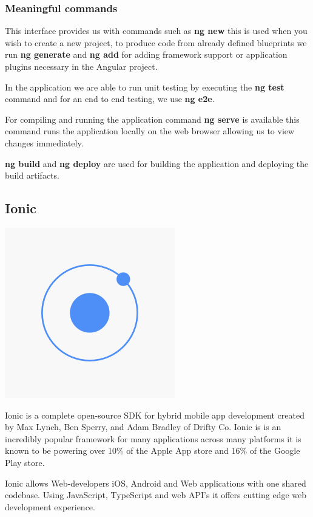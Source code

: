 \documentclass[a4paper,12pt]{report}
\begin{document}
\subsubsection{Meaningful commands}
This interface provides us with commands such as \textbf{ng new} this is used when you wish to create a new project, to produce code from already defined blueprints we run \textbf{ng generate} and \textbf{ng add} for adding framework support or application plugins necessary in the Angular project.

In the application we are able to run unit testing by executing the \textbf{ng test} command and for an end to end testing, we use \textbf{ng e2e}.

For compiling and running the application command \textbf{ng serve} is available this command runs the application locally on the web browser allowing us to view changes immediately.

\textbf{ng build} and \textbf{ng deploy} are used for building the application and deploying the build artifacts.\cite{angularGuide} 

\subsection{Ionic}
\includegraphics[scale=.1]{images/ionic.png}

Ionic is a complete open-source SDK for hybrid mobile app development created by Max Lynch, Ben Sperry, and Adam Bradley of Drifty Co.
Ionic is is an incredibly popular framework for many applications across many platforms it is known to be powering over 10\% of the Apple App store and 16\% of the Google Play store.

Ionic allows Web-developers iOS, Android and Web applications with one shared codebase. Using JavaScript, TypeScript and web API's it offers cutting edge web development experience.
\end{document}
